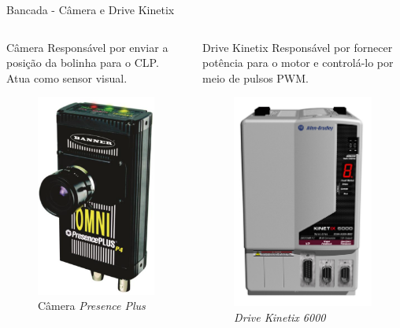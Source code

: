 \documentclass[10pt]{beamer}
\begin{document}
\begin{frame}[fragile]{Bancada - Câmera e Drive Kinetix}
\begin{columns}[T]

\begin{column}{.5\textwidth}
\begin{block}{Câmera}
Responsável por enviar a posição da bolinha para o CLP. Atua como sensor visual.
\end{block}

\begin{figure}[!ht]
	\centering
	\includegraphics[width=.3\linewidth]{figures/fundamentos/camera}
	\caption{Câmera \textit{Presence Plus} \cite{redytton}}
	\label{bancadacamera}
\end{figure}

\end{column}

\begin{column}{.5\textwidth}

\begin{block}{Drive Kinetix}
Responsável por fornecer potência para o motor e controlá-lo por meio de pulsos PWM.
\end{block}

\begin{figure}[!ht]
	\centering
	\includegraphics[width=.3\linewidth]{figures/fundamentos/kinetix6000}
	\caption{\textit{Drive Kinetix 6000} \cite{redytton}}
	\label{bancadadrive}
\end{figure}

\end{column}

\end{columns}
\end{frame}
\end{document}
